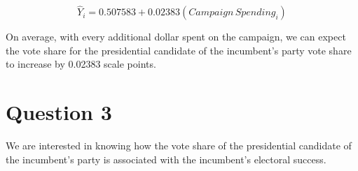 \documentclass[12pt,letterpaper]{article}
\begin{document}
		
		{ 			$$\hat{Y}_i =  0.507583 +  0.02383(Campaign \, Spending_i) $$} 
		
	
	\noindent On average, with every additional dollar spent on the campaign, we can expect the vote share for the presidential candidate of the incumbent's party vote share to increase by 0.02383 scale points.
		

	
	\newpage	
\section*{Question 3}

\noindent We are interested in knowing how the vote share of the presidential candidate of the incumbent's party is associated with the incumbent's electoral success.
	\vspace{.25cm}
\end{document}
